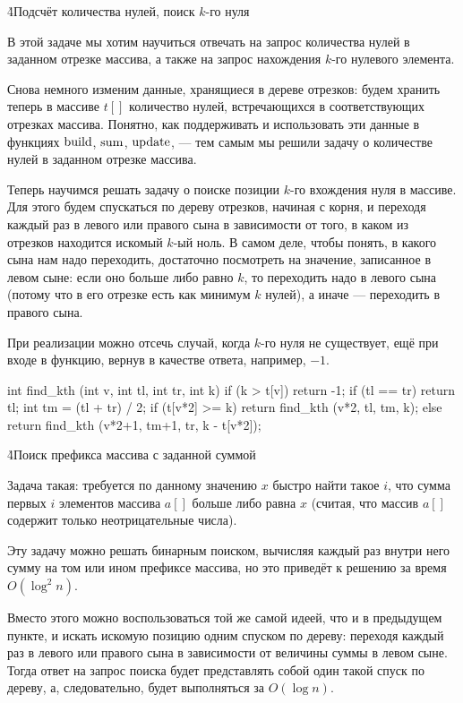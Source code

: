 \h4{Подсчёт количества нулей, поиск $k$-го нуля}

В этой задаче мы хотим научиться отвечать на запрос количества нулей в заданном отрезке массива, а также на запрос нахождения $k$-го нулевого элемента.

Снова немного изменим данные, хранящиеся в дереве отрезков: будем хранить теперь в массиве $t[]$ количество нулей, встречающихся в соответствующих отрезках массива. Понятно, как поддерживать и использовать эти данные в функциях $\rm build$, $\rm sum$, $\rm update$, --- тем самым мы решили задачу о количестве нулей в заданном отрезке массива.

Теперь научимся решать задачу о поиске позиции $k$-го вхождения нуля в массиве. Для этого будем спускаться по дереву отрезков, начиная с корня, и переходя каждый раз в левого или правого сына в зависимости от того, в каком из отрезков находится искомый $k$-ый ноль. В самом деле, чтобы понять, в какого сына нам надо переходить, достаточно посмотреть на значение, записанное в левом сыне: если оно больше либо равно $k$, то переходить надо в левого сына (потому что в его отрезке есть как минимум $k$ нулей), а иначе --- переходить в правого сына.

При реализации можно отсечь случай, когда $k$-го нуля не существует, ещё при входе в функцию, вернув в качестве ответа, например, $-1$.

\code
int find_kth (int v, int tl, int tr, int k) {
	if (k > t[v])
		return -1;
	if (tl == tr)
		return tl;
	int tm = (tl + tr) / 2;
	if (t[v*2] >= k)
		return find_kth (v*2, tl, tm, k);
	else
		return find_kth (v*2+1, tm+1, tr, k - t[v*2]);
}
\endcode

\h4{Поиск префикса массива с заданной суммой}

Задача такая: требуется по данному значению $x$ быстро найти такое $i$, что сумма первых $i$ элементов массива $a[]$ больше либо равна $x$ (считая, что массив $a[]$ содержит только неотрицательные числа).

Эту задачу можно решать бинарным поиском, вычисляя каждый раз внутри него сумму на том или ином префиксе массива, но это приведёт к решению за время $O (\log^2 n)$.

Вместо этого можно воспользоваться той же самой идеей, что и в предыдущем пункте, и искать искомую позицию одним спуском по дереву: переходя каждый раз в левого или правого сына в зависимости от величины суммы в левом сыне. Тогда ответ на запрос поиска будет представлять собой один такой спуск по дереву, а, следовательно, будет выполняться за $O (\log n)$.

